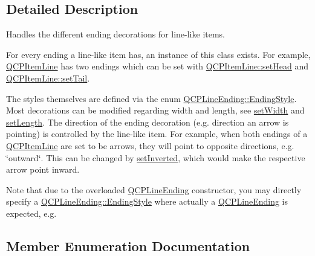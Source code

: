 \subsection{Detailed Description}
Handles the different ending decorations for line-\/like items. 

 For every ending a line-\/like item has, an instance of this class exists. For example, \hyperlink{class_q_c_p_item_line}{Q\+C\+P\+Item\+Line} has two endings which can be set with \hyperlink{class_q_c_p_item_line_aebf3d687114d584e0459db6759e2c3c3}{Q\+C\+P\+Item\+Line\+::set\+Head} and \hyperlink{class_q_c_p_item_line_ac264222c3297a7efe33df9345c811a5f}{Q\+C\+P\+Item\+Line\+::set\+Tail}.

The styles themselves are defined via the enum \hyperlink{class_q_c_p_line_ending_a5ef16e6876b4b74959c7261d8d4c2cd5}{Q\+C\+P\+Line\+Ending\+::\+Ending\+Style}. Most decorations can be modified regarding width and length, see \hyperlink{class_q_c_p_line_ending_a26dc020ea985a72cc25881ce2115e34e}{set\+Width} and \hyperlink{class_q_c_p_line_ending_ae36fa01763751cd64b7f56c3507e935a}{set\+Length}. The direction of the ending decoration (e.\+g. direction an arrow is pointing) is controlled by the line-\/like item. For example, when both endings of a \hyperlink{class_q_c_p_item_line}{Q\+C\+P\+Item\+Line} are set to be arrows, they will point to opposite directions, e.\+g. \char`\"{}outward\char`\"{}. This can be changed by \hyperlink{class_q_c_p_line_ending_a580e4e2360b35ebb8d68f3494aa2335d}{set\+Inverted}, which would make the respective arrow point inward.

Note that due to the overloaded \hyperlink{class_q_c_p_line_ending}{Q\+C\+P\+Line\+Ending} constructor, you may directly specify a \hyperlink{class_q_c_p_line_ending_a5ef16e6876b4b74959c7261d8d4c2cd5}{Q\+C\+P\+Line\+Ending\+::\+Ending\+Style} where actually a \hyperlink{class_q_c_p_line_ending}{Q\+C\+P\+Line\+Ending} is expected, e.\+g. 
\begin{DoxyCodeInclude}
\end{DoxyCodeInclude}


\subsection{Member Enumeration Documentation}
\mbox{\label{class_q_c_p_line_ending_a5ef16e6876b4b74959c7261d8d4c2cd5}} 
